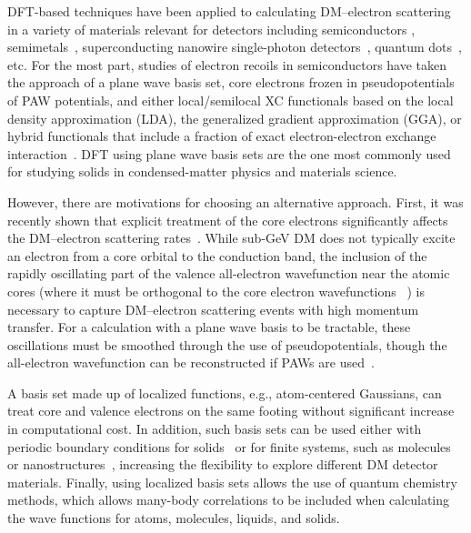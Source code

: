 \documentclass[
    prd, twocolumn, superscriptaddress, nofootinbib, amsmath, amssymb,
    aps, floatfix,preprintnumbers
]{revtex4-2}
\begin{document}
    DFT-based techniques have been applied to calculating DM--electron scattering in a variety of materials relevant for detectors including semiconductors \citep{Essig:2015cda, Knapen2021Diel, Knapen2022DarkELF, Griffin21, Trickle2022}, semimetals~\cite{Hochberg:2015fth}, superconducting nanowire single-photon detectors~\cite{Hochberg:2019cyy,Hochberg:2021yud}, quantum dots~\cite{blanco2022dark}, etc. For the most part, studies of electron recoils in semiconductors have taken the approach of a plane wave basis set, core electrons frozen in pseudopotentials of PAW potentials, and either local/semilocal XC functionals based on the local density approximation (LDA), the generalized gradient approximation (GGA), or hybrid functionals that include a fraction of exact electron-electron exchange interaction~\cite{Kahn:2021ttr}. DFT using plane wave basis sets are the one most commonly used for studying solids in condensed-matter physics and materials science.
    
    However, there are motivations for choosing an alternative approach. First, it was recently shown that explicit treatment of the core electrons significantly affects the DM--electron scattering rates~\cite{Liang:2018bdb,Griffin21,Trickle2022}. While sub-GeV DM does not typically excite an electron from a core orbital to the conduction band, the inclusion of the rapidly oscillating part of the valence all-electron wavefunction near the atomic cores (where it must be orthogonal to the core electron wavefunctions ~\cite{HEINE19701}) is necessary to capture DM--electron scattering events with high momentum transfer. For a calculation with a plane wave basis to be tractable, these oscillations must be smoothed through the use of pseudopotentials, though the all-electron wavefunction can be reconstructed if PAWs are used~\cite{Griffin21,Trickle2022}.
    
    A basis set made up of localized functions, e.g., atom-centered Gaussians, can treat core and valence electrons on the same footing without significant increase in computational cost. In addition, such basis sets can be used either with periodic boundary conditions for solids~\cite{PySCF2020} or for finite systems, such as molecules or nanostructures~\cite{PySCF2020}, increasing the flexibility to explore different DM detector materials. Finally, using localized basis sets allows the use of quantum chemistry methods, which allows many-body correlations to be included when calculating the wave functions for atoms, molecules, liquids, and solids.
    
\end{document}
